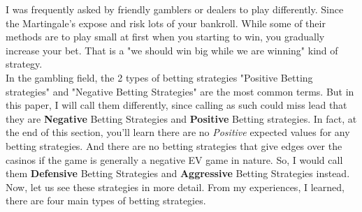 \documentclass{article}
\begin{document}
I was frequently asked by friendly gamblers or dealers to play differently.  Since the Martingale's expose and risk lots of your bankroll.  While some of their methods are to play small at first when you starting to win, you gradually increase your bet.  That is a "we should win big while we are winning" kind of strategy.  \\

In the gambling field, the 2 types of betting strategies "Positive Betting strategies" and "Negative Betting Strategies" are the most common terms.  But in this paper, I will call them differently, since calling as such could miss lead that they are \textbf{Negative} Betting Strategies and \textbf{Positive} Betting strategies.  In fact, at the end of this section, you'll learn there are no \emph{Positive} expected values for any betting strategies.  And there are no betting strategies that give edges over the casinos if the game is generally a negative EV game in nature.  So, I would call them \textbf{Defensive} Betting Strategies and \textbf{Aggressive} Betting Strategies instead.  Now, let us see these strategies in more detail. From my experiences, I learned, there are four main types of betting strategies. 
\end{document}
